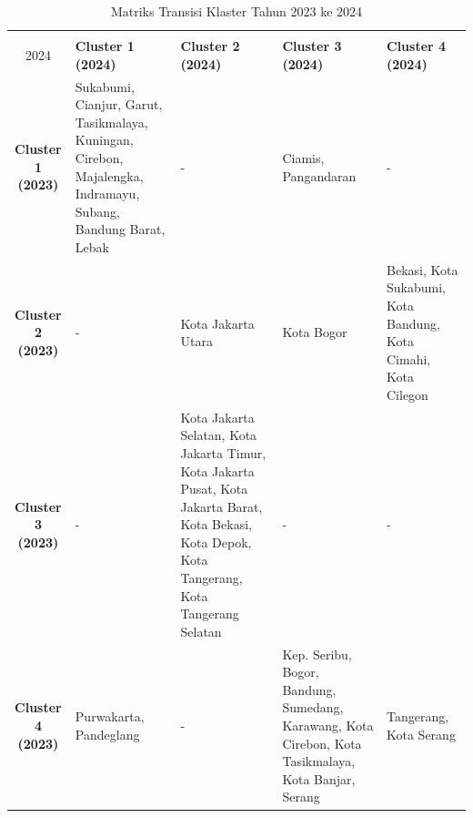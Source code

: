 \begin{table}[H]
\centering
\caption{Matriks Transisi Klaster Tahun 2023 ke 2024} \label{tab:transisi_2023_2024}
\begin{tabular}{|c|p{2cm}|p{2cm}|p{2cm}|p{2cm}|}
\hline
\textbf{Tahun 2023 \\ 2024} & \textbf{Cluster 1 (2024)} & \textbf{Cluster 2 (2024)} & \textbf{Cluster 3 (2024)} & \textbf{Cluster 4 (2024)} \\ \hline
\textbf{Cluster 1 (2023)} & Sukabumi, Cianjur, Garut, Tasikmalaya, Kuningan, Cirebon, Majalengka, Indramayu, Subang, Bandung Barat, Lebak & - & Ciamis, Pangandaran & - \\ \hline
\textbf{Cluster 2 (2023)} & - & Kota Jakarta Utara & Kota Bogor & Bekasi, Kota Sukabumi, Kota Bandung, Kota Cimahi, Kota Cilegon \\ \hline
\textbf{Cluster 3 (2023)} & - & Kota Jakarta Selatan, Kota Jakarta Timur, Kota Jakarta Pusat, Kota Jakarta Barat, Kota Bekasi, Kota Depok, Kota Tangerang, Kota Tangerang Selatan & - & - \\ \hline
\textbf{Cluster 4 (2023)} & Purwakarta, Pandeglang & - & Kep. Seribu, Bogor, Bandung, Sumedang, Karawang, Kota Cirebon, Kota Tasikmalaya, Kota Banjar, Serang & Tangerang, Kota Serang \\ \hline
\end{tabular}
\end{table}